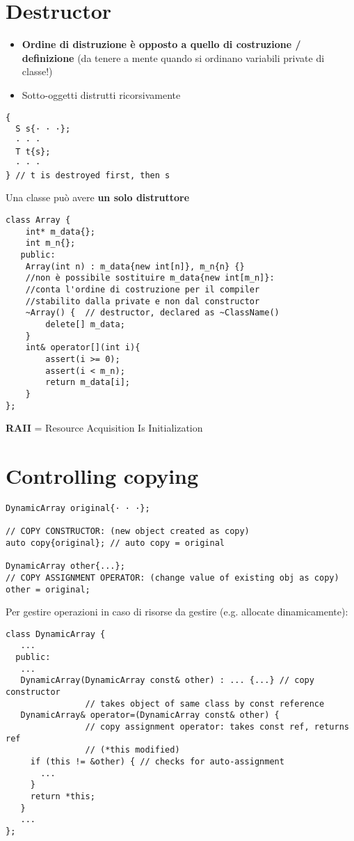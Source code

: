 \documentclass[10pt, oneside]{Book}
\begin{document}
\section{Destructor}
\begin{itemize}
\item \textbf{Ordine di distruzione è opposto a quello di costruzione / definizione} (da tenere a mente quando si ordinano variabili private di classe!)
\item Sotto-oggetti distrutti ricorsivamente
\end{itemize}
\begin{verbatim}
{
  S s{· · ·};
  · · ·
  T t{s};
  · · ·
} // t is destroyed first, then s
\end{verbatim}
Una classe può avere \textbf{un solo distruttore}
\begin{verbatim}
class Array {
    int* m_data{};
    int m_n{};
   public:
    Array(int n) : m_data{new int[n]}, m_n{n} {} 
    //non è possibile sostituire m_data{new int[m_n]}: 
    //conta l'ordine di costruzione per il compiler 
    //stabilito dalla private e non dal constructor
    ~Array() {  // destructor, declared as ~ClassName()
        delete[] m_data;
    }
    int& operator[](int i){
        assert(i >= 0);
        assert(i < m_n);
        return m_data[i];
    }
};
\end{verbatim}
\textbf{RAII} = Resource Acquisition Is Initialization

\section{Controlling copying}
\begin{verbatim}
DynamicArray original{· · ·};

// COPY CONSTRUCTOR: (new object created as copy)
auto copy{original}; // auto copy = original

DynamicArray other{...};
// COPY ASSIGNMENT OPERATOR: (change value of existing obj as copy)
other = original;
\end{verbatim}
Per gestire operazioni in caso di risorse da gestire (e.g. allocate dinamicamente):
\begin{verbatim}
class DynamicArray {
   ...
  public:
   ...
   DynamicArray(DynamicArray const& other) : ... {...} // copy constructor
                // takes object of same class by const reference
   DynamicArray& operator=(DynamicArray const& other) {
                // copy assignment operator: takes const ref, returns ref
                // (*this modified)
     if (this != &other) { // checks for auto-assignment
       ...
     }
     return *this;
   }
   ...
};
\end{verbatim}
\end{document}
